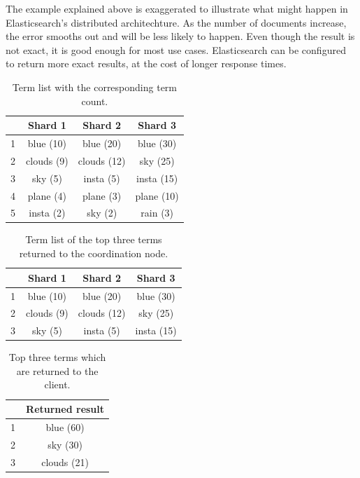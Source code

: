 The example explained above is exaggerated to illustrate what might happen in Elasticsearch's distributed architechture.
As the number of documents increase, the error smooths out and will be less likely to happen.
Even though the result is not exact, it is good enough for most use cases.
Elasticsearch can be configured to return more exact results,
at the cost of longer response times.

\begin{table}[h!]
    \centering
    \begin{tabular}{|l|c|c|c|}
    \hline
    ~ & \textbf{Shard 1}    & \textbf{Shard 2}     & \textbf{Shard 3}    \\ \hline
    1 & blue (10)  & blue (20)   & blue (30)  \\ \hline
    2 & clouds (9) & clouds (12) & sky (25)   \\ \hline
    3 & sky (5)    & insta (5)   & insta (15) \\ \hline
    4 & plane (4)  & plane (3)   & plane (10) \\ \hline
    5 & insta (2)  & sky (2)     & rain (3)   \\ \hline
    \end{tabular}
    \caption{Term list with the corresponding term count.}
    \label{tbl:shard-term-counts}
\end{table}

\begin{table}[h!]
    \centering
    \begin{tabular}{|l|c|c|c|}
    \hline
    ~ & \textbf{Shard 1}    & \textbf{Shard 2}     & \textbf{Shard 3}    \\ \hline
    1 & blue (10)  & blue (20)   & blue (30)  \\ \hline
    2 & clouds (9) & clouds (12) & sky (25)   \\ \hline
    3 & sky (5)    & insta (5)   & insta (15) \\ \hline
    \end{tabular}
    \caption{Term list of the top three terms returned to the coordination node.}
    \label{tbl:shard-top}
\end{table}

\begin{table}[h!]
    \centering
    \begin{tabular}{|l|c|}
    \hline
    ~ & \textbf{Returned result} \\ \hline
    1 & blue (60)     \\ \hline
    2 & sky (30)    \\ \hline
    3 & clouds (21)       \\ \hline
    \end{tabular}
    \caption{Top three terms which are returned to the client.}
    \label{tbl:final-result}
\end{table}

